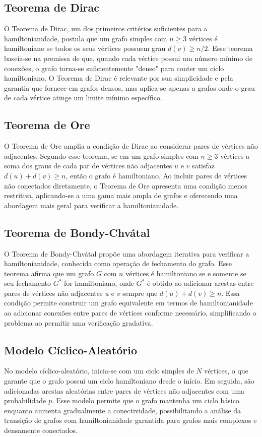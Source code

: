 \documentclass[12pt, openright, oneside, a4paper, chapter=TITLE, section=TITLE, subsection=TITLE, subsubsection=TITLE, brazil]{abntex2}
\begin{document}
\subsection{Teorema de Dirac}
O Teorema de Dirac, um dos primeiros critérios suficientes para a hamiltonianidade, postula que um grafo simples com $n \geq 3$ vértices é hamiltoniano se todos os seus vértices possuem grau $d(v) \geq n/2$. Esse teorema baseia-se na premissa de que, quando cada vértice possui um número mínimo de conexões, o grafo torna-se suficientemente "denso" para conter um ciclo hamiltoniano. O Teorema de Dirac é relevante por sua simplicidade e pela garantia que fornece em grafos densos, mas aplica-se apenas a grafos onde o grau de cada vértice atinge um limite mínimo específico.

\subsection{Teorema de Ore}
O Teorema de Ore amplia a condição de Dirac ao considerar pares de vértices não adjacentes. Segundo esse teorema, se em um grafo simples com $n \geq 3$ vértices a soma dos graus de cada par de vértices não adjacentes $u$ e $v$ satisfaz $d(u) + d(v) \geq n$, então o grafo é hamiltoniano. Ao incluir pares de vértices não conectados diretamente, o Teorema de Ore apresenta uma condição menos restritiva, aplicando-se a uma gama mais ampla de grafos e oferecendo uma abordagem mais geral para verificar a hamiltonianidade.

\subsection{Teorema de Bondy-Chvátal}
O Teorema de Bondy-Chvátal propõe uma abordagem iterativa para verificar a hamiltonianidade, conhecida como operação de fechamento do grafo. Esse teorema afirma que um grafo $G$ com $n$ vértices é hamiltoniano se e somente se seu fechamento $G^{*}$ for hamiltoniano, onde $G^{*}$ é obtido ao adicionar arestas entre pares de vértices não adjacentes $u$ e $v$ sempre que $d(u) + d(v) \geq n$. Essa condição permite construir um grafo equivalente em termos de hamiltonianidade ao adicionar conexões entre pares de vértices conforme necessário, simplificando o problema ao permitir uma verificação gradativa.

\subsection{Modelo Cíclico-Aleatório}
No modelo cíclico-aleatório, inicia-se com um ciclo simples de $N$ vértices, o que garante que o grafo possui um ciclo hamiltoniano desde o início. Em seguida, são adicionadas arestas aleatórias entre pares de vértices não adjacentes com uma probabilidade $p$. Esse modelo permite que o grafo mantenha um ciclo básico enquanto aumenta gradualmente a conectividade, possibilitando a análise da transição de grafos com hamiltonianidade garantida para grafos mais complexos e densamente conectados.
\end{document}
